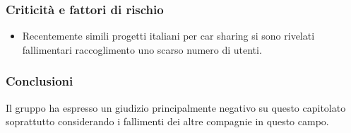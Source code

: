 \subsubsection{Criticità e fattori di rischio}
\begin{itemize}
	\item Recentemente simili progetti italiani per car sharing si sono rivelati fallimentari raccoglimento uno scarso numero di utenti.
\end{itemize}
\subsubsection{Conclusioni}
Il gruppo ha espresso un giudizio principalmente negativo su questo capitolato soprattutto considerando i fallimenti dei altre compagnie in questo campo.